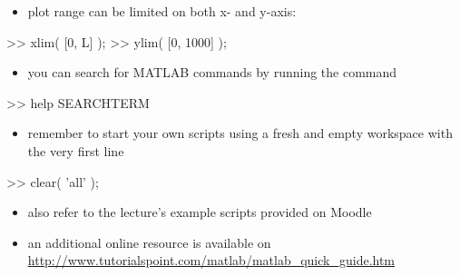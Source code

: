 \begin{itemize}
	\item plot range can be limited on both x- and y-axis:
\end{itemize}
\begin{code}
>> xlim( [0, L] ); \color{medium}%
>> ylim( [0, 1000] ); \color{medium}%
\end{code}
\begin{itemize}
	\item you can search for MATLAB commands by running the command
\end{itemize}
\begin{code}
>> help SEARCHTERM
\end{code}
\begin{itemize}
	\item remember to start your own scripts using a fresh and empty workspace with the very first line
\end{itemize}
\begin{code}
>> clear( 'all' );
\end{code}
\begin{itemize}
	\item also refer to the lecture's example scripts provided on Moodle
	\item an additional online resource is available on \url{http://www.tutorialspoint.com/matlab/matlab_quick_guide.htm}
\end{itemize}

